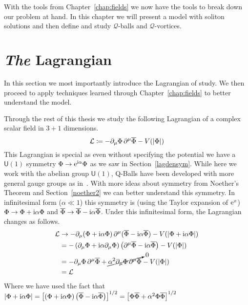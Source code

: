 
With the tools from Chapter~\ref{chap:fields} we now have the tools to break
down our problem at hand. In this chapter we will present a model with soliton
solutions and then define and study \(\mathcal{Q}\)-balls and
\(\mathcal{Q}\)-vortices.

\section{\textit{The} Lagrangian}
In this section we most importantly introduce the Lagrangian of study. We then
proceed to apply techniques learned through Chapter~\ref{chap:fields} to better
understand the model.

Through the rest of this thesis we study the following Lagrangian of a complex
scalar field in \(3+1\) dimensions.
\begin{equation}\label{eq:complexlag}
    \mathcal{L}\coloneqq -\partial_\mu\Phi\,\partial^\mu\overline{\Phi} - V(|\Phi|)
\end{equation}
This Lagrangian is special as even without specifying the potential we have a
\(\mathsf{U}(1)\) symmetry \(\Phi \to \mathrm{e}^{\mathrm{i}\alpha}\Phi\) as we saw in
Section~\ref{lagdensym}. While here we work with the abelian group
\(\mathsf{U}(1)\), Q-Balls have been developed with more general gauge groups as
in~\cite{nonabelian}. With more ideas about symmetry from Noether's Theorem and
Section~\ref{noether2} we can better understand this symmetry. In infinitesimal
form (\(\alpha\ll 1\)) this symmetry is (using the Taylor expansion of \(\mathrm{e}^x\))
\(\Phi \to \Phi + \mathrm{i}\alpha\Phi\) and \(\overline{\Phi} \to \overline{\Phi} - \mathrm{i}\alpha\overline{\Phi}\).
Under this infinitesimal form, the Lagrangian changes as follows.
\begin{align}
    \mathcal{L} & \to -\partial_\mu(\Phi + \mathrm{i}\alpha\Phi)\,\partial^\mu(\overline{\Phi} - \mathrm{i}\alpha\overline{\Phi}) - V(|\Phi + \mathrm{i}\alpha\Phi|) \\
         & = -\left(\partial_\mu\Phi + \mathrm{i}\alpha\partial_\mu\Phi\right)\left(\partial^\mu\overline{\Phi} - \mathrm{i}\alpha\overline{\Phi}\right) - V(|\Phi|) \\
         & = -\partial_\mu\Phi\,\partial^\mu\overline{\Phi} + \cancelto{0}{\alpha^2\partial_\mu\Phi\,\partial^\mu\overline{\Phi}} - V(|\Phi|) \\
         & = \mathcal{L}
\end{align}
Where we have used the fact that \(|\Phi + \mathrm{i}\alpha\Phi| = \left[\left(\Phi + \mathrm{i}\alpha\Phi\right)\left(\overline{\Phi} - \mathrm{i}\alpha\overline{\Phi}\right)\right]^{1/2} = \left[\Phi\overline{\Phi} + \alpha^2\Phi\overline{\Phi}\right]^{1/2}\)
